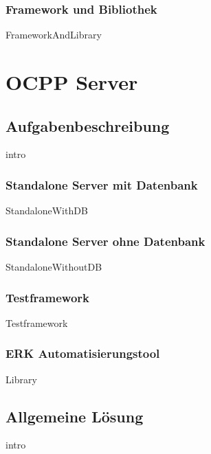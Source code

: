 \documentclass{article}
\begin{document}
        \newpage
        \subsubsection{Framework und Bibliothek}
            {FrameworkAndLibrary}
\newpage



\section{OCPP Server}
    \subsection{Aufgabenbeschreibung}
    \label{kap:taskDescription}
        {intro}
        \subsubsection{Standalone Server mit Datenbank}
        \label{kap:taskDescription:standaloneWithDB}
            {StandaloneWithDB}

        \subsubsection{Standalone Server ohne Datenbank}
        {StandaloneWithoutDB}

        \subsubsection{Testframework}
            {Testframework}

        \subsubsection{ERK Automatisierungstool}
            {Library}
    \newpage
    \subsection{Allgemeine Lösung}
    \label{kap:commonSolution}
        {intro}
\end{document}
